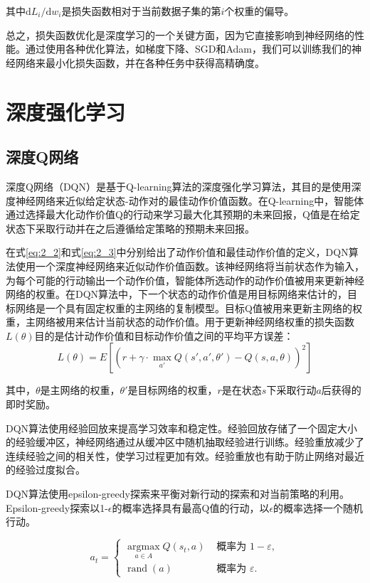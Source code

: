 其中$\mathrm{d}{L_i} / \mathrm{d}{w_i}$是损失函数相对于当前数据子集的第$i$个权重的偏导。

总之，损失函数优化是深度学习的一个关键方面，因为它直接影响到神经网络的性能。通过使用各种优化算法，如梯度下降、SGD和Adam，我们可以训练我们的神经网络来最小化损失函数，并在各种任务中获得高精确度。


\section{深度强化学习}

\subsection{深度Q网络}

深度Q网络（DQN）是基于Q-learning算法的深度强化学习算法，其目的是使用深度神经网络来近似给定状态-动作对的最佳动作价值函数。在Q-learning中，智能体通过选择最大化动作价值Q的行动来学习最大化其预期的未来回报，Q值是在给定状态下采取行动并在之后遵循给定策略的预期未来回报。

在式\ref{eq:2_2}和式\ref{eq:2_3}中分别给出了动作价值和最佳动作价值的定义，DQN算法使用一个深度神经网络来近似动作价值函数。该神经网络将当前状态作为输入，为每个可能的行动输出一个动作价值，智能体所选动作的动作价值被用来更新神经网络的权重。在DQN算法中，下一个状态的动作价值是用目标网络来估计的，目标网络是一个具有固定权重的主网络的复制模型。目标Q值被用来更新主网络的权重，主网络被用来估计当前状态的动作价值。用于更新神经网络权重的损失函数$L(\theta)$目的是估计动作价值和目标动作价值之间的平均平方误差：
\begin{equation}
\label{eq:2_22}
L(\theta) = E\left[\left(r + \gamma \cdot \max _{a'} Q(s', a', \theta') - Q(s, a, \theta)\right)^2\right ]
\end{equation}


其中，$\theta$是主网络的权重，$\theta '$是目标网络的权重，$r$是在状态$s$下采取行动$a$后获得的即时奖励。

DQN算法使用经验回放来提高学习效率和稳定性。经验回放存储了一个固定大小的经验缓冲区，神经网络通过从缓冲区中随机抽取经验进行训练。经验重放减少了连续经验之间的相关性，使学习过程更加有效。经验重放也有助于防止网络对最近的经验过度拟合。

DQN算法使用epsilon-greedy探索来平衡对新行动的探索和对当前策略的利用。Epsilon-greedy探索以1-$\epsilon$的概率选择具有最高Q值的行动，以$\epsilon$的概率选择一个随机行动。

\begin{equation}
\label{eq:2_23}
{a}_{t}= \begin{cases}\underset{{a} \in A}{\operatorname{argmax}} Q\left({s}_{t} ,{a}\right) & \text { 概率为 } 1-\varepsilon, \\ \operatorname{rand}({a}) & \text { 概率为 } \varepsilon.\end{cases}
\end{equation}


